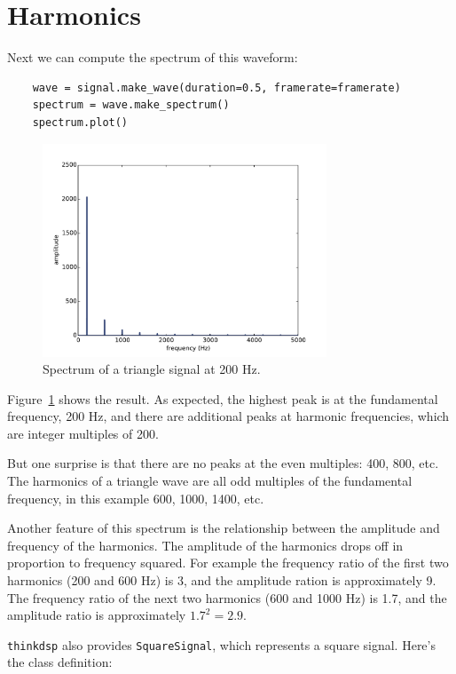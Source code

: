 \documentclass[12pt]{book}
\begin{document}
\section{Harmonics}

Next we can compute the spectrum of this waveform:

\begin{verbatim}
    wave = signal.make_wave(duration=0.5, framerate=framerate)
    spectrum = wave.make_spectrum()
    spectrum.plot()
\end{verbatim}

\begin{figure}
\centerline{\includegraphics[height=2.5in]{figs/triangle-200-2.pdf}}
\caption{Spectrum of a triangle signal at 200 Hz.}
\label{fig.triangle.200.2}
\end{figure}

Figure~\ref{fig.triangle.200.2} shows the result.  As expected, the
highest peak is at the fundamental frequency, 200 Hz, and there
are additional peaks at harmonic frequencies, which are integer
multiples of 200.

But one surprise is that there are no peaks at the even multiples:
400, 800, etc.  The harmonics of a triangle wave are all
odd multiples of the fundamental frequency, in this example
600, 1000, 1400, etc.

Another feature of this spectrum is the relationship between the
amplitude and frequency of the harmonics.  The amplitude of the
harmonics drops off in proportion to frequency squared.  For example
the frequency ratio of the first two harmonics (200 and 600 Hz) is 3, and the
amplitude ration is approximately 9.  The frequency ratio of the
next two harmonics (600 and 1000 Hz) is 1.7, and the amplitude ratio
is approximately $1.7^2 = 2.9$.

{\tt thinkdsp} also provides {\tt SquareSignal}, which represents
a square signal.  Here's the class definition:
\end{document}
